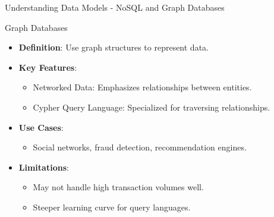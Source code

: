 \documentclass[aspectratio=169]{beamer}
\begin{document}
\begin{frame}[fragile]{Understanding Data Models - NoSQL and Graph Databases}
    \begin{block}{Graph Databases}
        \begin{itemize}
            \item \textbf{Definition}: Use graph structures to represent data.
            \item \textbf{Key Features}:
                \begin{itemize}
                    \item Networked Data: Emphasizes relationships between entities.
                    \item Cypher Query Language: Specialized for traversing relationships.
                \end{itemize}
            \item \textbf{Use Cases}:
                \begin{itemize}
                    \item Social networks, fraud detection, recommendation engines.
                \end{itemize}
            \item \textbf{Limitations}:
                \begin{itemize}
                    \item May not handle high transaction volumes well.
                    \item Steeper learning curve for query languages.
                \end{itemize}
        \end{itemize}
    \end{block}
\end{frame}
\end{document}
